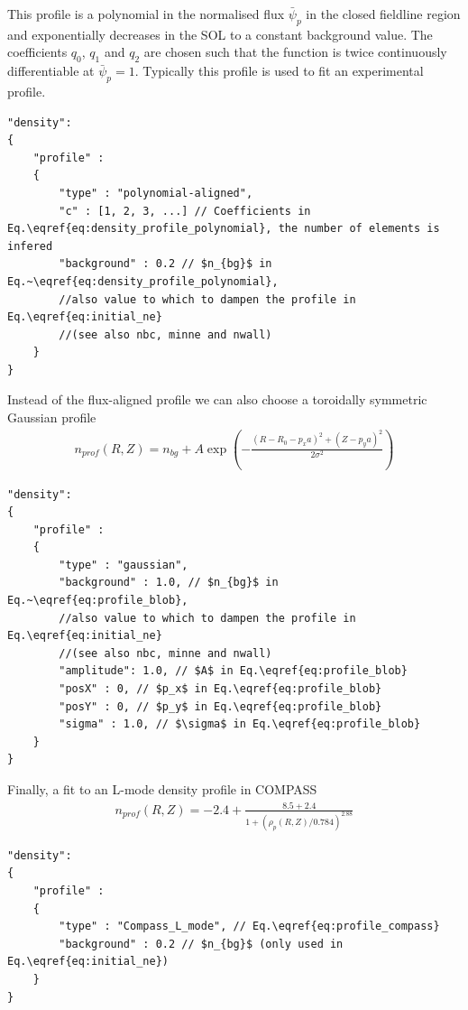 This profile is a polynomial in the normalised flux $\bar \psi_p$ in the closed fieldline region and exponentially
decreases in the SOL to a constant background value.
The coefficients $q_0$, $q_1$ and $q_2$ are chosen such that the function is twice continuously differentiable at $\bar \psi_p =1$.
Typically this profile is used to fit an experimental profile.
\begin{verbatim}
"density":
{
    "profile" :
    {
        "type" : "polynomial-aligned",
        "c" : [1, 2, 3, ...] // Coefficients in Eq.\eqref{eq:density_profile_polynomial}, the number of elements is infered
        "background" : 0.2 // $n_{bg}$ in Eq.~\eqref{eq:density_profile_polynomial},
        //also value to which to dampen the profile in Eq.\eqref{eq:initial_ne}
        //(see also nbc, minne and nwall)
    }
}
\end{verbatim}
\noindent
Instead of the flux-aligned profile we can also choose a toroidally symmetric Gaussian profile
\begin{align} \label{eq:profile_blob}
    n_{prof}(R,Z) = n_{bg} + A \exp\left( -\frac{(R - R_0 - p_x a)^2 + (Z-p_ya)^2}{2\sigma^2} \right)
\end{align}
\begin{verbatim}
"density":
{
    "profile" :
    {
        "type" : "gaussian",
        "background" : 1.0, // $n_{bg}$ in Eq.~\eqref{eq:profile_blob},
        //also value to which to dampen the profile in Eq.\eqref{eq:initial_ne}
        //(see also nbc, minne and nwall)
        "amplitude": 1.0, // $A$ in Eq.\eqref{eq:profile_blob}
        "posX" : 0, // $p_x$ in Eq.\eqref{eq:profile_blob}
        "posY" : 0, // $p_y$ in Eq.\eqref{eq:profile_blob}
        "sigma" : 1.0, // $\sigma$ in Eq.\eqref{eq:profile_blob}
    }
}
\end{verbatim}
Finally, a fit to an L-mode density profile in COMPASS
\begin{align} \label{eq:profile_compass}
    n_{prof}(R,Z) = -2.4 + \frac{8.5+2.4}{1 + (\rho_p(R,Z)/0.784)^{2.88}}
\end{align}
\begin{verbatim}
"density":
{
    "profile" :
    {
        "type" : "Compass_L_mode", // Eq.\eqref{eq:profile_compass}
        "background" : 0.2 // $n_{bg}$ (only used in Eq.\eqref{eq:initial_ne})
    }
}
\end{verbatim}
